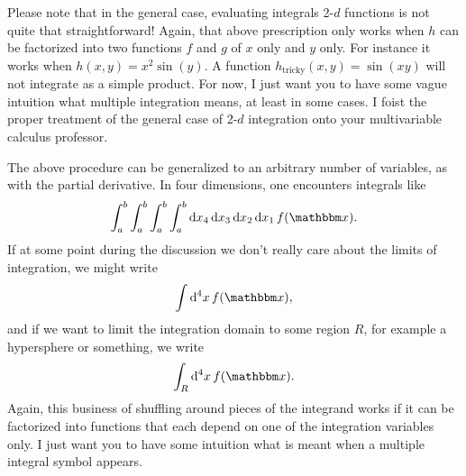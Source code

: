 

Please note that in the general case, evaluating integrals 2-$d$ functions
is not quite that straightforward! Again, that above prescription only works
when $h$ can be factorized into two functions $f$ and $g$ of $x$ only and $y$
only. For instance it works when $h(x,y)=x^2\sin(y)$.
A function $h_{\text{tricky}}(x,y)=\sin(xy)$ will not integrate as a simple
product.
For now, I just want you to have some vague intuition what multiple integration
means, at least in some cases.
I foist the proper treatment of the general case of 2-$d$
integration onto your multivariable calculus professor.


The above procedure can be generalized to an arbitrary number of variables, as with
the partial derivative. In four dimensions, one encounters integrals like
\begin{equation}
\int_a^b\int_a^b\int_a^b\int_a^b
\dd{x_4}\dd{x_3}\dd{x_2}\dd{x_1}f(\fvec{x}).
\end{equation}
If at some point during the discussion we don't really care about the limits of
integration, we might write
\begin{equation}
\int\dd[4]{x}f(\fvec{x}),
\end{equation}
and if we want to limit the integration domain to some region $R$, for example a
hypersphere or something, we write
\begin{equation}
\int_R\dd[4]{x}f(\fvec{x}).
\end{equation}
Again, this business of shuffling around pieces of the integrand works if
it can be factorized into functions that each depend on one of the integration
variables only.
I just want you to have some intuition what is meant when a multiple integral
symbol appears.

